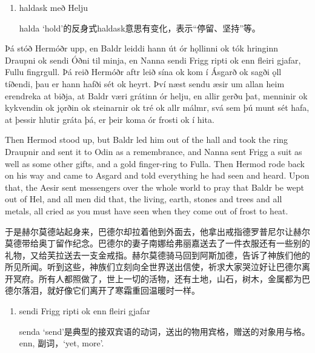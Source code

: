 \begin{grammar*}{}
  \begin{enumerate}[leftmargin=*]
    \item haldask með Helju

          halda `hold'的反身式haldask意思有变化，表示“停留、坚持”等。
  \end{enumerate}
\end{grammar*}
\begin{paracol}{2}
  Þá stóð Hermóðr upp, en Baldr leiddi hann út ór hǫllinni ok tók hringinn Draupni ok sendi Óðni til minja, en Nanna sendi Frigg ripti ok enn fleiri gjafar, Fullu fingrgull. Þá reið Hermóðr aftr leið sína ok kom í Ásgarð ok sagði ǫll tíðendi, þau er hann hafði sét ok heyrt. Því næst sendu æsir um allan heim erendreka at biðja, at Baldr væri grátinn ór helju, en allir gerðu þat, menninir ok kykvendin ok jǫrðin ok steinarnir ok tré ok allr málmr, svá sem þú munt sét hafa, at þessir hlutir gráta þá, er þeir koma ór frosti ok í hita.

  \switchcolumn

  Then Hermod stood up, but Baldr led him out of the hall and took the ring Draupnir and sent it to Odin as a remembrance, and Nanna sent Frigg a suit as well as some other gifts, and a gold finger-ring to Fulla. Then Hermod rode back on his way and came to Asgard and told everything he had seen and heard. Upon that, the Aesir sent messengers over the whole world to pray that Baldr be wept out of Hel, and all men did that, the living, earth, stones and trees and all metals, all cried as you must have seen when they come out of frost to heat.
\end{paracol}
\begin{translation*}{}
  于是赫尔莫德站起身来，巴德尔却拉着他到外面去，他拿出戒指德罗普尼尔让赫尔莫德带给奥丁留作纪念。巴德尔的妻子南娜给弗丽嘉送去了一件衣服还有一些别的礼物，又给芙拉送去一支金戒指。赫尔莫德骑马回到阿斯加德，告诉了神族们他的所见所闻。听到这些，神族们立刻向全世界送出信使，祈求大家哭泣好让巴德尔离开冥府。所有人都照做了，世上一切的活物，还有土地，山石，树木，金属都为巴德尔落泪，就好像它们离开了寒霜重回温暖时一样。
\end{translation*}
\begin{grammar*}{}
  \begin{enumerate}[leftmargin=*]
    \item sendi Frigg ripti ok enn fleiri gjafar

          senda `send'是典型的接双宾语的动词，送出的物用宾格，赠送的对象用与格。enn, 副词，`yet, more'.
  \end{enumerate}
\end{grammar*}
